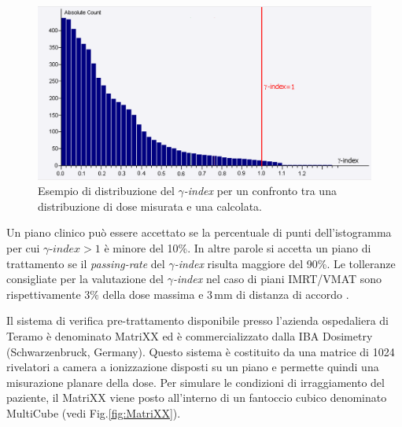 \begin{figure}
\centering
\includegraphics[width=\textwidth]{./cap2/gamma_histo.png}
\caption{Esempio di distribuzione del $\gamma$\textit{-index} per un confronto tra una distribuzione di dose misurata e una calcolata.}
\label{fig:gamma_histo}
\end{figure}

Un piano clinico può essere accettato se la percentuale di punti dell'istogramma per cui $\gamma\textit{-index} > 1$ è minore del 10\%. In altre parole si accetta un piano di trattamento se il \textit{passing-rate} del $\gamma$\textit{-index} risulta maggiore del 90\%. Le tolleranze consigliate per la valutazione del $\gamma$\textit{-index} nel caso di piani IMRT/VMAT sono rispettivamente $3\%$ della dose massima e $3\,$mm di distanza di accordo \cite{Ezzell2009}.

Il sistema di verifica pre-trattamento disponibile presso l'azienda ospedaliera di Teramo è denominato MatriXX ed è commercializzato dalla IBA Dosimetry (Schwarzenbruck, Germany). Questo sistema è costituito da una matrice di 1024 rivelatori a camera a ionizzazione disposti su un piano e permette quindi una misurazione planare della dose. Per simulare le condizioni di irraggiamento del paziente, il MatriXX viene posto all'interno di un fantoccio cubico denominato MultiCube (vedi Fig.\ref{fig:MatriXX}). 

